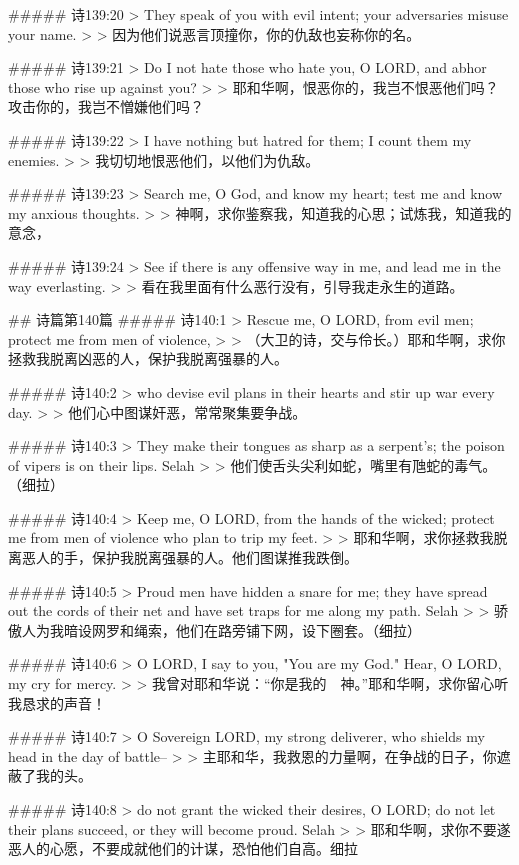 ##### 诗139:20
> They speak of you with evil intent; your adversaries misuse your name.
>
> 因为他们说恶言顶撞你，你的仇敌也妄称你的名。


##### 诗139:21
> Do I not hate those who hate you, O LORD, and abhor those who rise up against you?
>
> 耶和华啊，恨恶你的，我岂不恨恶他们吗？攻击你的，我岂不憎嫌他们吗？


##### 诗139:22
> I have nothing but hatred for them; I count them my enemies.
>
> 我切切地恨恶他们，以他们为仇敌。


##### 诗139:23
> Search me, O God, and know my heart; test me and know my anxious thoughts.
>
> 神啊，求你鉴察我，知道我的心思；试炼我，知道我的意念，


##### 诗139:24
> See if there is any offensive way in me, and lead me in the way everlasting.
>
> 看在我里面有什么恶行没有，引导我走永生的道路。


## 诗篇第140篇
##### 诗140:1
> Rescue me, O LORD, from evil men; protect me from men of violence,
>
> （大卫的诗，交与伶长。）耶和华啊，求你拯救我脱离凶恶的人，保护我脱离强暴的人。


##### 诗140:2
> who devise evil plans in their hearts and stir up war every day.
>
> 他们心中图谋奸恶，常常聚集要争战。


##### 诗140:3
> They make their tongues as sharp as a serpent's; the poison of vipers is on their lips. Selah
>
> 他们使舌头尖利如蛇，嘴里有虺蛇的毒气。（细拉）


##### 诗140:4
> Keep me, O LORD, from the hands of the wicked; protect me from men of violence who plan to trip my feet.
>
> 耶和华啊，求你拯救我脱离恶人的手，保护我脱离强暴的人。他们图谋推我跌倒。


##### 诗140:5
> Proud men have hidden a snare for me; they have spread out the cords of their net and have set traps for me along my path. Selah
>
> 骄傲人为我暗设网罗和绳索，他们在路旁铺下网，设下圈套。（细拉）


##### 诗140:6
> O LORD, I say to you, "You are my God." Hear, O LORD, my cry for mercy.
>
> 我曾对耶和华说：“你是我的　神。”耶和华啊，求你留心听我恳求的声音！


##### 诗140:7
> O Sovereign LORD, my strong deliverer, who shields my head in the day of battle--
>
> 主耶和华，我救恩的力量啊，在争战的日子，你遮蔽了我的头。


##### 诗140:8
> do not grant the wicked their desires, O LORD; do not let their plans succeed, or they will become proud. Selah
>
> 耶和华啊，求你不要遂恶人的心愿，不要成就他们的计谋，恐怕他们自高。细拉


